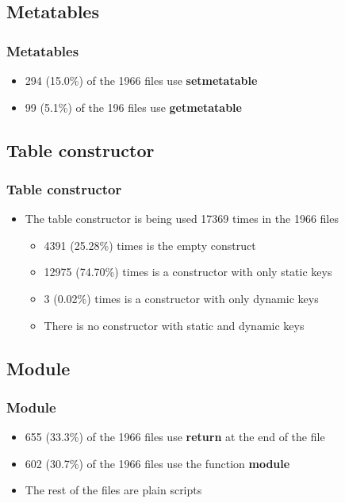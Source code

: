 \documentclass{beamer}
\begin{document}
\subsection{Metatables}
\begin{frame}
\frametitle{Metatables}
\begin{itemize}
\item 294 (15.0\%) of the 1966 files use \textbf{setmetatable}
\item 99 (5.1\%) of the 196 files use \textbf{getmetatable}
\end{itemize}
\end{frame}

\subsection{Table constructor}
\begin{frame}
\frametitle{Table constructor}
\begin{itemize}
\item The table constructor is being used 17369 times in the 1966 files
\begin{itemize}
\item 4391 (25.28\%) times is the empty construct
\item 12975 (74.70\%) times is a constructor with only static keys
\item 3 (0.02\%) times is a constructor with only dynamic keys
\item There is no constructor with static and dynamic keys
\end{itemize}
\end{itemize}
\end{frame}

\subsection{Module}
\begin{frame}
\frametitle{Module}
\begin{itemize}
\item 655 (33.3\%) of the 1966 files use \textbf{return} at the end of the file
\item 602 (30.7\%) of the 1966 files use the function \textbf{module}
\item The rest of the files are plain scripts
\end{itemize}
\end{frame}
\end{document}
